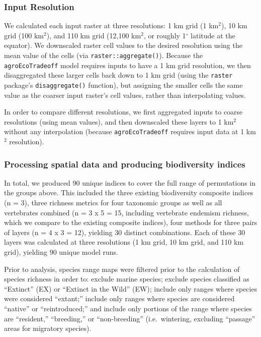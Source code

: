 \documentclass[
]{article}
\begin{document}
\hypertarget{input-resolution}{%
\subsubsection{Input Resolution}\label{input-resolution}}

We calculated each input raster at three resolutions: 1 km grid (1 km\(^2\)), 10 km grid (100 km\(^2\)), and 110 km grid (12,100 km\(^2\), or roughly 1\(^{\circ}\) latitude at the equator). We downscaled raster cell values to the desired resolution using the mean value of the cells (via \texttt{raster::aggregate()}). Because the \texttt{agroEcoTradeoff} model requires inputs to have a 1 km grid resolution, we then disaggregated these larger cells back down to 1 km grid (using the \texttt{raster} package's \texttt{disaggregate()} function), but assigning the smaller cells the same value as the coarser input raster's cell values, rather than interpolating values.

In order to compare different resolutions, we first aggregated inputs to coarse resolutions (using mean values), and then downscaled these layers to 1 km\(^2\) without any interpolation (because \texttt{agroEcoTradeoff} requires input data at 1 km\(^2\) resolution).

\hypertarget{processing-spatial-data-and-producing-biodiversity-indices}{%
\subsubsection{Processing spatial data and producing biodiversity indices}\label{processing-spatial-data-and-producing-biodiversity-indices}}

In total, we produced 90 unique indices to cover the full range of permutations in the groups above. This included the three existing biodiversity composite indices (n = 3), three richness metrics for four taxonomic groups as well as all vertebrates combined (n = 3 x 5 = 15, including vertebrate endemism richness, which we compare to the existing composite indices), four methods for three pairs of layers (n = 4 x 3 = 12), yielding 30 distinct combinations. Each of these 30 layers was calculated at three resolutions (1 km grid, 10 km grid, and 110 km grid), yielding 90 unique model runs.

Prior to analysis, species range maps were filtered prior to the calculation of species richness in order to: exclude marine species; exclude species classified as ``Extinct'' (EX) or ``Extinct in the Wild'' (EW); include only ranges where species were considered ``extant;'' include only ranges where species are considered ``native'' or ``reintroduced;'' and include only portions of the range where species are ``resident,'' ``breeding,'' or ``non-breeding'' (i.e.~wintering, excluding ``passage'' areas for migratory species).
\end{document}
